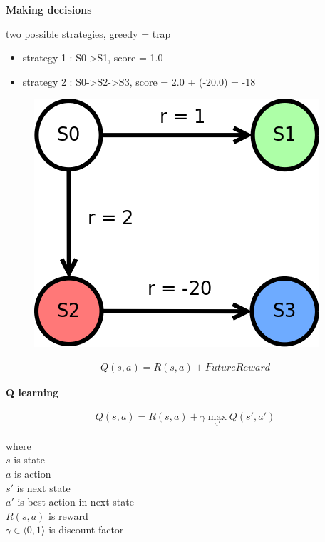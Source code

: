 \documentclass[xcolor=dvipsnames]{beamer}
\begin{document}
\begin{frame}{\bf Making decisions}

two possible strategies, greedy = trap
\begin{itemize}
  \item strategy 1 : S0->S1, score = 1.0
  \item strategy 2 : S0->S2->S3, score = 2.0 + (-20.0) = -18
\end{itemize}

  \begin{figure}
    \includegraphics[scale=0.4]{../../diagrams/rl_trivial_trap.png}
  \end{figure}

  \begin{align*}
    Q(s, a) = R(s, a) + FutureReward
  \end{align*}

\end{frame}


\begin{frame}{\bf Q learning}

\begin{align*}
Q(s, a) = R(s, a) + \gamma \max \limits_{a'} Q(s', a')
\end{align*}

where \\
$s$ is state \\
$a$ is action \\
$s'$ is next state \\
$a'$ is best action in next state \\
$R(s, a)$ is reward \\
$\gamma \in \langle 0, 1 \rangle$ is discount factor \\

\end{frame}
\end{document}

